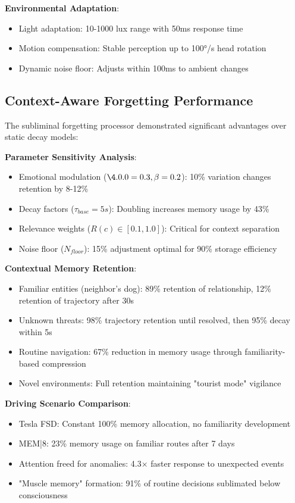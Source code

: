 \documentclass[11pt,letterpaper]{article}
\begin{document}
\textbf{Environmental Adaptation}:
\begin{itemize}
\item Light adaptation: 10-1000 lux range with 50ms response time
\item Motion compensation: Stable perception up to 100°/s head rotation
\item Dynamic noise floor: Adjusts within 100ms to ambient changes
\end{itemize}

\subsection{Context-Aware Forgetting Performance}

The subliminal forgetting processor demonstrated significant advantages over static decay models:

\textbf{Parameter Sensitivity Analysis}:
\begin{itemize}
\item Emotional modulation ($\4.0.0=0.3, \beta=0.2$): 10\% variation changes retention by 8-12\%
\item Decay factors ($\tau_{base}=5s$): Doubling increases memory usage by 43\%
\item Relevance weights ($R(c) \in [0.1,1.0]$): Critical for context separation
\item Noise floor ($N_{floor}$): 15\% adjustment optimal for 90\% storage efficiency
\end{itemize}

\textbf{Contextual Memory Retention}:
\begin{itemize}
\item Familiar entities (neighbor's dog): 89\% retention of relationship, 12\% retention of trajectory after 30s
\item Unknown threats: 98\% trajectory retention until resolved, then 95\% decay within 5s
\item Routine navigation: 67\% reduction in memory usage through familiarity-based compression
\item Novel environments: Full retention maintaining "tourist mode" vigilance
\end{itemize}

\textbf{Driving Scenario Comparison}:
\begin{itemize}
\item Tesla FSD: Constant 100\% memory allocation, no familiarity development
\item MEM|8: 23\% memory usage on familiar routes after 7 days
\item Attention freed for anomalies: 4.3× faster response to unexpected events
\item "Muscle memory" formation: 91\% of routine decisions sublimated below consciousness
\end{itemize}
\end{document}
